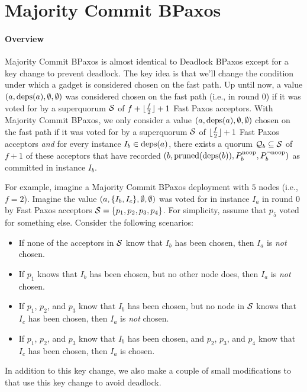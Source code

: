 \section{Majority Commit BPaxos}
\paragraph{Overview}
Majority Commit BPaxos is almost identical to Deadlock BPaxos except for a key
change to prevent deadlock. The key idea is that we'll change the condition
under which a gadget is considered chosen on the fast path. Up until now, a
value $(a, \text{deps}(a), \emptyset{}, \emptyset{})$ was considered chosen on the
fast path (i.e., in round 0) if it was voted for by a superquorum
$\mathcal{S}$ of $f + \lfloor\frac{f}{2}\rfloor + 1$ Fast Paxos acceptors. With Majority
Commit BPaxos, we only consider a value $(a, \text{deps}(a), \emptyset{},
\emptyset{})$ chosen on the fast path if it was voted for by a superquorum
$\mathcal{S}$ of $\lfloor\frac{f}{2}\rfloor + 1$ Fast Paxos acceptors \emph{and} for
every instance $I_b \in \text{deps}(a)$, there exists a quorum $\mathcal{Q}_b \subseteq
\mathcal{S}$ of $f + 1$ of these acceptors that have recorded $(b,
\text{pruned}(\text{deps}(b)), P^{\text{noop}}_{b}, P^{\lnot \text{noop}}_{b})$ as committed in instance $I_b$.

For example, imagine a Majority Commit BPaxos deployment with $5$ nodes (i.e.,
$f = 2$). Imagine the value $(a, \{I_b, I_c\}, \emptyset, \emptyset)$ was
voted for in instance $I_a$ in round $0$ by Fast Paxos acceptors $\mathcal{S}
= \{p_1, p_2, p_3, p_4\}$. For simplicity, assume that $p_5$ voted for
something else. Consider the following scenarios:
\begin{itemize}
  \item
    If none of the acceptors in $\mathcal{S}$ know that $I_b$ has been chosen,
    then $I_a$ is \emph{not} chosen.
  \item
    If $p_1$ knows that $I_b$ has been chosen, but no other node does, then
    $I_a$ is \emph{not} chosen.
  \item
    If $p_1$, $p_2$, and $p_3$ know that $I_b$ has been chosen, but no node in
    $\mathcal{S}$ knows that $I_c$ has been chosen, then $I_a$ is \emph{not}
    chosen.
  \item
    If $p_1$, $p_2$, and $p_3$ know that $I_b$ has been chosen, and $p_2$,
    $p_3$, and $p_4$ know that $I_c$ has been chosen, then $I_a$ is chosen.
\end{itemize}

In addition to this key change, we also make a couple of small modifications to
 that use this key change to avoid deadlock.

